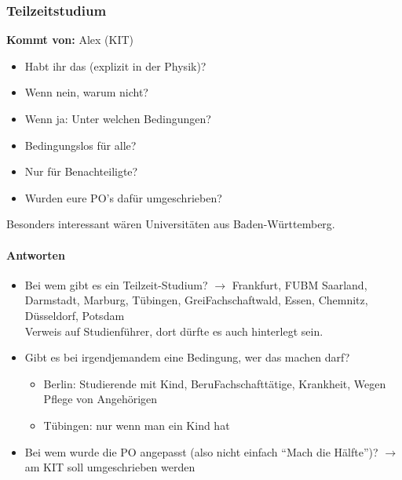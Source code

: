     \subsubsection*{Teilzeitstudium}
      \textbf{Kommt von:} Alex (KIT)
      \begin{itemize}
        \item Habt ihr das (explizit in der Physik)?
        \item Wenn nein, warum nicht?
        \item Wenn ja: Unter welchen Bedingungen?
        \item Bedingungslos für alle?
        \item Nur für Benachteiligte?
        \item Wurden eure PO’s dafür umgeschrieben?
      \end{itemize}
      Besonders interessant wären Universitäten aus Baden-Württemberg.

      \paragraph{Antworten}
        \begin{itemize}
          \item Bei wem gibt es ein Teilzeit-Studium? $\rightarrow$ Frankfurt, FUBM Saarland, Darmstadt, Marburg, Tübingen, GreiFachschaftwald, Essen, Chemnitz, Düsseldorf, Potsdam \\
            Verweis auf Studienführer, dort dürfte es auch hinterlegt sein.
          \item Gibt es bei irgendjemandem eine Bedingung, wer das machen darf?
            \begin{itemize}
              \item Berlin: Studierende mit Kind, BeruFachschafttätige, Krankheit, Wegen Pflege von Angehörigen
              \item Tübingen: nur wenn man ein Kind hat
            \end{itemize}
          \item Bei wem wurde die PO angepasst (also nicht einfach “Mach die Hälfte”)? $\rightarrow$ am KIT soll umgeschrieben werden
        \end{itemize}
